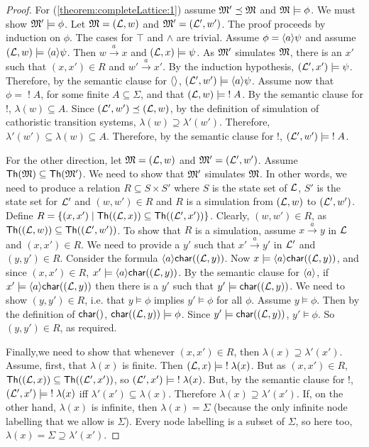 \begin{proof}
For (\ref{theorem:completeLattice:1}) assume $\frak{M}' \preceq \frak{M}$
and $\frak{M} \models \phi$.  We must show $\frak{M}' \models \phi$.  Let
$\frak{M} = (\mathcal{L}, w)$ and $\frak{M}' = (\mathcal{L}', w')$.  The proof proceeds by
induction on $\phi$.  The cases for $\top$ and $\land$ are trivial.
Assume $\phi = \langle a \rangle \psi$ and assume $(\mathcal{L}, w) \models
\langle a \rangle \psi$.  Then $w \xrightarrow{a} x$ and $(\mathcal{L}, x) \models
\psi$.  As $\frak{M}'$ simulates $\frak{M}$, there is an $x'$ such that
$(x,x') \in R$ and $w' \xrightarrow{a} x'$.  By the induction
hypothesis, $(\mathcal{L}', x') \models \psi$.  Therefore, by the semantic
clause for $\MAY{}$, $(\mathcal{L}', w') \models \langle a \rangle \psi$.  Assume now
that $\phi = \; ! \; A$, for some finite $A \subseteq \Sigma$, and
that $(\mathcal{L}, w) \models \; ! \; A$.  By the semantic clause for $!$,
$\lambda(w) \subseteq A$.  Since $(\mathcal{L}', w') \preceq (\mathcal{L}, w)$, by
the definition of simulation of cathoristic transition systems, $\lambda(w)
\supseteq \lambda'(w')$.  Therefore, $\lambda'(w') \subseteq
\lambda(w) \subseteq A$.  Therefore, by the semantic clause for $!$,
$(\mathcal{L}', w') \models \; ! \; A$.

For the other direction, let $\frak{M} = (\mathcal{L}, w)$ and $\frak{M}' = (\mathcal{L}',
w')$.  Assume $\mathsf{Th}(\frak{M}) \subseteq \mathsf{Th}(\frak{M}') $. We need to
show that $\frak{M}'$ simulates $\frak{M}$.  In other words, we need to
produce a relation $R \subseteq S \times S'$ where $S$ is the state
set of $\mathcal{L}$, $S'$ is the state set for $\mathcal{L}'$ and $(w,w') \in R$
and $R$ is a simulation from $(\mathcal{L}, w)$ to $ (\mathcal{L}', w')$.  Define $R
= \{(x,x') \; | \; \mathsf{Th}( (\mathcal{L}, x)) \subseteq \mathsf{Th}( (\mathcal{L}',
  x'))\}$.  Clearly, $(w,w') \in R$, as $\mathsf{Th}((\mathcal{L}, w)) \subseteq
\mathsf{Th}((\mathcal{L}', w')) $.  To show that $R$ is a simulation, assume $x
\xrightarrow{a} y$ in $\mathcal{L}$ and $(x,x') \in R$. 
We need to provide a
$y'$ such that $x' \xrightarrow{a} y'$ in $\mathcal{L}'$ and $(y,y') \in R$.  
Consider the formula $\langle a \rangle \mathsf{char}((\mathcal{L}, y))$. 
Now $x \models \langle a \rangle \mathsf{char}((\mathcal{L}, y))$, and since $(x,x') \in R$, $x' \models \langle a \rangle \mathsf{char}((\mathcal{L}, y))$.
By the semantic clause for $\MAY{a}$, if $x' \models \langle a \rangle \mathsf{char}((\mathcal{L}, y))$ then there is a $y'$ such that 
$y' \models \mathsf{char}((\mathcal{L}, y))$.
We need to show $(y,y') \in R$, i.e. that $y \models \phi$ implies $y' \models \phi$ for all $\phi$.
Assume $y \models \phi$. 
Then by the definition of $\CHAR$, $\mathsf{char}((\mathcal{L}, y)) \models \phi$.
Since $y' \models \mathsf{char}((\mathcal{L}, y))$, $y' \models \phi$. 
So $(y,y') \in R$, as required.

Finally,we need to show that whenever $(x,x') \in R$, then $\lambda(x)
\supseteq \lambda'(x')$.  Assume, first, that $\lambda(x)$ is finite.
Then $(\mathcal{L}, x) \models \; ! \; \lambda(x)$.  But as $(x,x') \in R$,
$\mathsf{Th}((\mathcal{L}, x)) \subseteq \mathsf{Th}((\mathcal{L}', x')) $, so $(\mathcal{L}', x')
\models \; ! \; \lambda(x)$.  But, by the semantic clause for $!$,
$(\mathcal{L}', x') \models \; ! \; \lambda(x)$ iff $\lambda'(x') \subseteq
\lambda(x)$.  Therefore $\lambda(x) \supseteq \lambda'(x')$.  If, on
the other hand, $\lambda(x)$ is infinite, then $\lambda(x) = \Sigma$
(because the only infinite node labelling that we allow is
$\Sigma$). Every node labelling is a subset of $\Sigma$, so here too,
$\lambda(x) = \Sigma \supseteq \lambda'(x')$.  


\end{proof}
